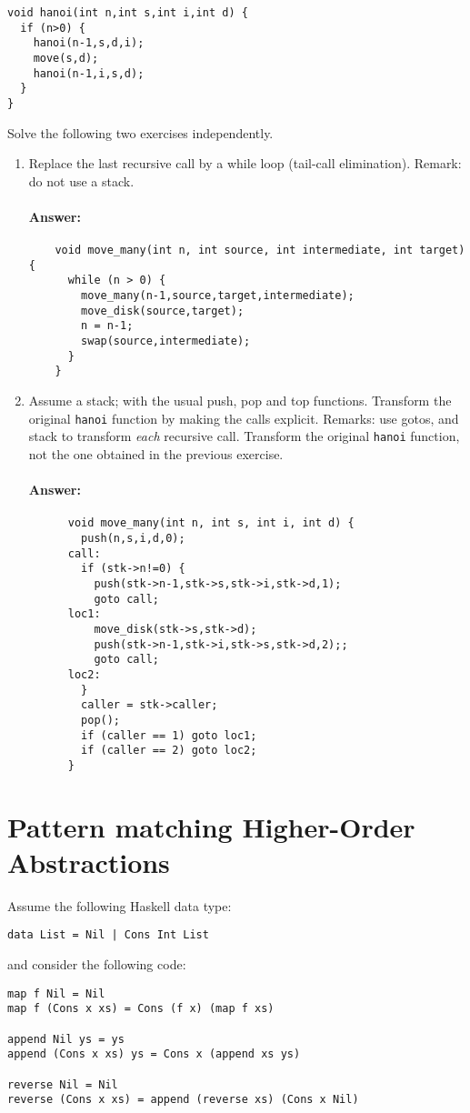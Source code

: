 \documentclass{article}
\newcommand{\answer}[0]{\paragraph{Answer:}}
\begin{document}
\begin{verbatim}
void hanoi(int n,int s,int i,int d) {
  if (n>0) {
    hanoi(n-1,s,d,i);
    move(s,d);
    hanoi(n-1,i,s,d);
  }
}
\end{verbatim}

Solve the following two exercises independently.
\begin{enumerate}
\item Replace the last recursive call by a while loop (tail-call
  elimination). Remark: do not use a stack. 

\answer{
\begin{verbatim}
    void move_many(int n, int source, int intermediate, int target) {
      while (n > 0) {
        move_many(n-1,source,target,intermediate);
        move_disk(source,target);
        n = n-1;
        swap(source,intermediate);
      }
    }
\end{verbatim}
}
\item Assume a stack; with the usual push, pop and top
  functions. Transform the original \texttt{hanoi} function by making
  the calls explicit. Remarks: use gotos, and stack to transform \emph{each}
  recursive call. Transform the original \texttt{hanoi} function, not
  the one obtained in the previous exercise. 
  \answer{
    \begin{verbatim}
      void move_many(int n, int s, int i, int d) {
        push(n,s,i,d,0);
      call:
        if (stk->n!=0) {
          push(stk->n-1,stk->s,stk->i,stk->d,1);
          goto call;
      loc1:
          move_disk(stk->s,stk->d);
          push(stk->n-1,stk->i,stk->s,stk->d,2);;
          goto call;
      loc2:
        }
        caller = stk->caller;
        pop();
        if (caller == 1) goto loc1;
        if (caller == 2) goto loc2;
      }
    \end{verbatim}
  }
\end{enumerate}
\newpage
\section{Pattern matching Higher-Order Abstractions}

Assume the following Haskell data type:
\begin{verbatim}
data List = Nil | Cons Int List
\end{verbatim}
and consider the following code:
\begin{verbatim}
map f Nil = Nil
map f (Cons x xs) = Cons (f x) (map f xs)

append Nil ys = ys
append (Cons x xs) ys = Cons x (append xs ys)

reverse Nil = Nil
reverse (Cons x xs) = append (reverse xs) (Cons x Nil)
\end{verbatim}
\end{document}
